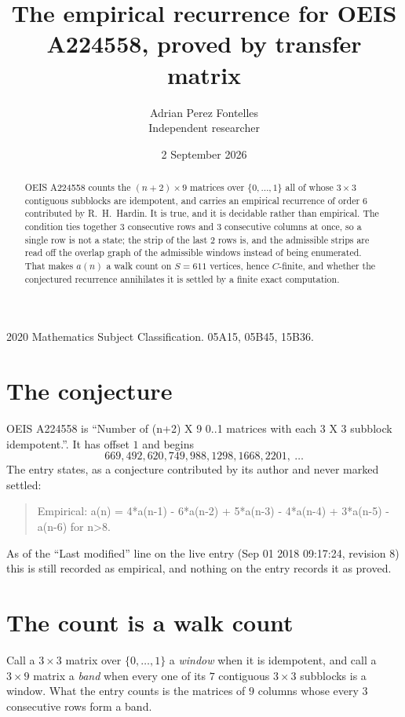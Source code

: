 \documentclass[11pt,a4paper]{article}
\title{The empirical recurrence for OEIS A224558, proved by transfer matrix}
\author{Adrian Perez Fontelles\\ \small Independent researcher}
\date{2 September 2026}
\theoremstyle{plain}
\theoremstyle{definition}
\begin{document}
\maketitle

\begin{abstract}
OEIS A224558 counts the $(n+2)\times9$ matrices over $\{0,\dots,1\}$ all of whose
$3\times3$ contiguous subblocks are idempotent, and carries an empirical recurrence of order
$6$ contributed by R.~H.~Hardin. It is true, and it is decidable rather than empirical.
The condition ties together $3$ consecutive rows and $3$ consecutive columns at once, so a
single row is not a state; the strip of the last $2$ rows is, and the admissible strips
are read off the overlap graph of the admissible windows instead of being enumerated. That
makes $a(n)$ a walk count on $S=611$ vertices, hence $C$-finite, and whether the conjectured
recurrence annihilates it is settled by a finite exact computation.
\end{abstract}

\noindent\small 2020 Mathematics Subject Classification. 05A15, 05B45, 15B36.\normalsize

\section{The conjecture}

OEIS A224558 is ``Number of (n+2) X 9 0..1 matrices with each 3 X 3 subblock idempotent.''. It has offset $1$ and begins
\[
669, 492, 620, 749, 988, 1298, 1668, 2201,\ \dots
\]
The entry states, as a conjecture contributed by its author and never marked settled:
\begin{quote}
Empirical: a(n) = 4*a(n-1) - 6*a(n-2) + 5*a(n-3) - 4*a(n-4) + 3*a(n-5) - a(n-6) for n>8.
\end{quote}
As of the ``Last modified'' line on the live entry (Sep 01 2018 09:17:24, revision 8) this is still
recorded as empirical, and nothing on the entry records it as proved.

\section{The count is a walk count}

Call a $3\times3$ matrix over $\{0,\dots,1\}$ a \emph{window} when it is idempotent, and
call a $3\times9$ matrix a \emph{band} when every one of its $7$ contiguous
$3\times3$ subblocks is a window. What the entry counts is the matrices of $9$ columns
whose every $3$ consecutive rows form a band.
\end{document}
